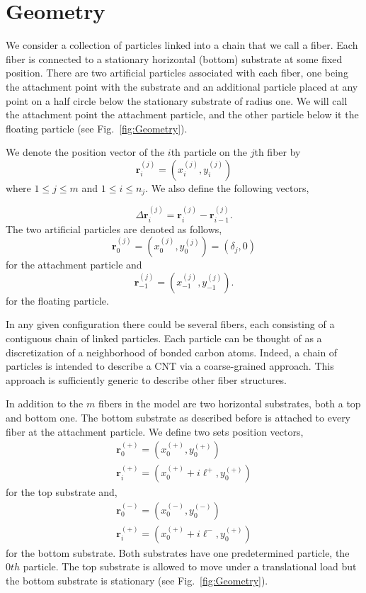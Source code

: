 \section{Geometry}

	We consider a collection of particles linked into a chain that we call a fiber. Each fiber is connected to a stationary horizontal (bottom) substrate at some fixed position. There are two artificial particles associated with each fiber, one being the attachment point with the substrate and an additional particle placed at any point on a half circle below the stationary substrate of radius one. We will call the attachment point the attachment particle, and the other particle below it the floating particle (see Fig.~\ref{fig:Geometry}).
	
We denote the position vector of the $i$th particle on the $j$th fiber by
\begin{equation}
	\textbf{r}_i^{(j)} = (x_i^{(j)},y_i^{(j)})
\end{equation}
where $1 \leq j \leq m$ and $1 \leq i \leq n_j$. We also define the following vectors,

\begin{equation}
	\Delta \textbf{r}_i^{(j)} = \textbf{r}_i^{(j)} - \textbf{r}_{i-1}^{(j)}.
\end{equation}
The two artificial particles are denoted as follows,
\begin{equation}
	\textbf{r}_0^{(j)} = (x_0^{(j)},y_0^{(j)}) = (\delta_j,0)
\end{equation}
for the attachment particle and
\begin{equation}
	\textbf{r}_{-1}^{(j)} = (x_{-1}^{(j)},y_{-1}^{(j)}).
\end{equation}
for the floating particle.

	In any given configuration there could be several fibers, each consisting of a contiguous chain of linked particles. Each particle can be thought of as a discretization of a neighborhood of bonded carbon atoms. Indeed, a chain of particles is intended to describe a CNT via a coarse-grained approach. This approach is sufficiently generic to describe other fiber structures.
	
	In addition to the $m$ fibers in the model are two horizontal substrates, both a top and bottom one. The bottom substrate as described before is attached to every fiber at the attachment particle. We define two sets position vectors,
\begin{eqnarray}
	\textbf{r}_0^{(+)} = (x_0^{(+)},y_0^{(+)}) \\
	\textbf{r}_i^{(+)} = (x_0^{(+)} + i\ell^+,y_0^{(+)})
\end{eqnarray}
for the top substrate and,
\begin{eqnarray}
	\textbf{r}_0^{(-)} = (x_0^{(-)},y_0^{(-)}) \\
	\textbf{r}_i^{(+)} = (x_0^{(+)} + i\ell^-,y_0^{(+)})
\end{eqnarray} 
for the bottom substrate. Both substrates have one predetermined particle, the $0th$ particle. The top substrate is allowed to move under a translational load but the bottom substrate is stationary (see Fig.~\ref{fig:Geometry}).

